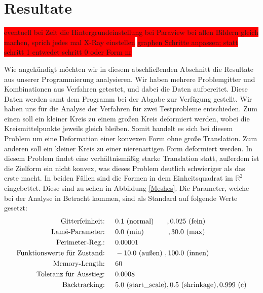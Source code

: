 
\section{Resultate}\label{Chap_results}

\colorbox{red}{ eventuell bei Zeit die Hintergrundeinstellung bei Paraview bei allen Bildern gleich machen, sprich jedes mal X-Ray einstellen} \newline
\colorbox{red}{graphen Schritte anpassen; statt schritt 1 entwedet schritt 0 oder Form nr}

Wie angekündigt möchten wir in diesem abschließenden Abschnitt die Resultate aus unserer Programmierung analysieren. Wir haben mehrere Problemgitter und Kombinationen aus Verfahren getestet, und dabei die Daten aufbereitet. Diese Daten werden samt dem Programm bei der Abgabe zur Verfügung gestellt.
Wir haben uns für die Analyse der Verfahren für zwei Testprobleme entschieden. Zum einen soll ein kleiner Kreis zu einem großen Kreis deformiert werden, wobei die Kreismittelpunkte jeweils gleich bleiben. Somit handelt es sich bei diesem Problem um eine Deformation einer konvexen Form ohne große Translation. Zum anderen soll ein kleiner Kreis zu einer nierenartigen Form deformiert werden. In diesem Problem findet eine verhältnismäßig starke Translation statt, außerdem ist die Zielform ein nicht konvex, was dieses Problem deutlich schwieriger als das erste macht. In beiden Fällen sind die Formen in dem Einheitsquadrat im $\mathbb{R}^2$ eingebettet. Diese sind zu sehen in Abbildung \ref{Meshes}. 
Die Parameter, welche bei der Analyse in Betracht kommen, sind als Standard auf folgende Werte gesetzt:
\begin{align*}
\text{Gitterfeinheit: \hspace{0.2cm} }& 0.1 \text{ (normal)} \hspace{0.65cm} ,0.025 \text{ (fein)} \\
\text{Lamé-Parameter: \hspace{0.2cm} }& 0.0 \text{ (min)} \hspace{1.2cm}  ,30.0 \text{ (max)} \\
\text{Perimeter-Reg.: \hspace{0.2cm} }& 0.00001 \\
\text{Funktionswerte für Zustand: \hspace{0.2cm} }& -10.0 \text{ (außen) },  100.0 \text{ (innen)} \\
\text{Memory-Length: \hspace{0.2cm} }& 60 \\
\text{Toleranz für Ausstieg: \hspace{0.2cm} }& 0.0008 \\
\text{Backtracking: \hspace{0.2cm} }& 5.0 \text{ (start\_scale)}, 0.5 \text{ (shrinkage)}, 0.999 \text{ (c)}
\end{align*}

